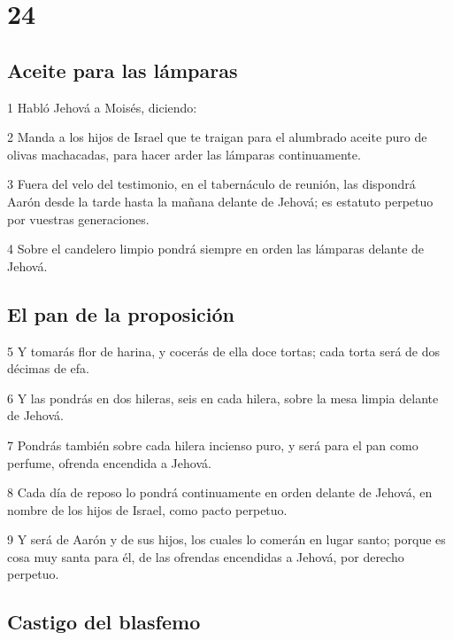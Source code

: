 \chapter{24}

\section*{Aceite para las lámparas}

\par 1 Habló Jehová a Moisés, diciendo:
\par 2 Manda a los hijos de Israel que te traigan para el alumbrado aceite puro de olivas machacadas, para hacer arder las lámparas continuamente.
\par 3 Fuera del velo del testimonio, en el tabernáculo de reunión, las dispondrá Aarón desde la tarde hasta la mañana delante de Jehová; es estatuto perpetuo por vuestras generaciones.
\par 4 Sobre el candelero limpio pondrá siempre en orden las lámparas delante de Jehová.

\section*{El pan de la proposición}

\par 5 Y tomarás flor de harina, y cocerás de ella doce tortas; cada torta será de dos décimas de efa.
\par 6 Y las pondrás en dos hileras, seis en cada hilera, sobre la mesa limpia delante de Jehová.
\par 7 Pondrás también sobre cada hilera incienso puro, y será para el pan como perfume, ofrenda encendida a Jehová.
\par 8 Cada día de reposo lo pondrá continuamente en orden delante de Jehová, en nombre de los hijos de Israel, como pacto perpetuo.
\par 9 Y será de Aarón y de sus hijos, los cuales lo comerán en lugar santo; porque es cosa muy santa para él, de las ofrendas encendidas a Jehová, por derecho perpetuo.

\section*{Castigo del blasfemo}

